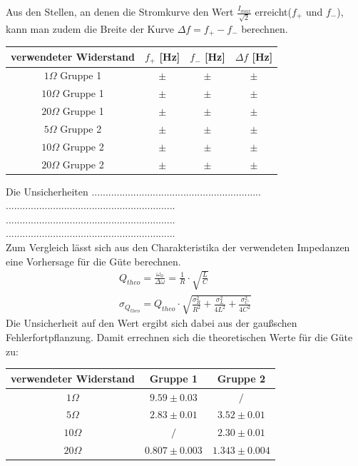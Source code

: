\documentclass[a4paper, 11pt]{article}
\begin{document}
Aus den Stellen, an denen die Stromkurve den Wert $\frac{I_{max}}{\sqrt{2}}$ erreicht($f_+$ und $f_-$), kann man zudem die Breite der Kurve $\Delta f = f_+ - f_-$ berechnen.
\begin{center}
\renewcommand{\arraystretch}{1.5}
\begin{tabular}{|c|c|c|c|}
\hline verwendeter Widerstand	& $f_+$	[Hz]&	$f_-$	[Hz] & $\Delta f $ [Hz] 	\\
\hline $  1 \Omega $ Gruppe 1	&	$ \pm $	&	$ \pm $	&	$ \pm $	 	\\
\hline $ 10 \Omega $ Gruppe 1	&	$ \pm $	&	$ \pm $	&	$ \pm $		\\
\hline $ 20 \Omega $ Gruppe 1	&	$ \pm $	&	$ \pm $	&	$ \pm $		\\
\hline $  5 \Omega $ Gruppe 2 	&	$ \pm $	&	$ \pm $	&	$ \pm $	 	\\
\hline $ 10 \Omega $ Gruppe 2	&	$ \pm $	&	$ \pm $	&	$ \pm $		\\
\hline $ 20 \Omega $ Gruppe 2	&	$ \pm $	&	$ \pm $	&	$ \pm $		\\
\hline
\end{tabular}
\end{center}
Die Unsicherheiten 
.............................................................\\
.............................................................\\
.............................................................\\
.............................................................\\





Zum Vergleich lässt sich aus den Charakteristika der verwendeten Impedanzen eine Vorhersage für die Güte berechnen.
\begin{eqnarray*}
Q_{theo} = \frac{\omega_0}{\Delta \omega} = \frac{1}{R} \cdot \sqrt{\frac{L}{C}} \\
\sigma_{Q_{theo}} = Q_{theo} \cdot \sqrt{\frac{\sigma_R^2}{R^2} + \frac{\sigma_L^2}{4L^2} + \frac{\sigma_C^2}{4C^2}}
\end{eqnarray*}
Die Unsicherheit auf den Wert ergibt sich dabei aus der gaußschen Fehlerfortpflanzung. Damit errechnen sich die theoretischen Werte für die Güte zu:

\begin{center}
\renewcommand{\arraystretch}{1.5}
\begin{tabular}{|c|c|c|}
\hline verwendeter Widerstand	&	Gruppe 1	&	Gruppe 2 \\
\hline $  1 \Omega $		&	$ 9.59 \pm 0.03$	&	$ / $ 	\\
\hline $  5 \Omega $		&	$ 2.83 \pm 0.01$	&	$ 3.52 \pm 0.01$ 	\\
\hline $ 10 \Omega $		&	$ / $	&	$ 2.30 \pm 0.01$ 	\\
\hline $ 20 \Omega $		&	$ 0.807 \pm 0.003$	&	$ 1.343 \pm 0.004$ 	\\
\hline
\end{tabular}
\end{center}
\end{document}
